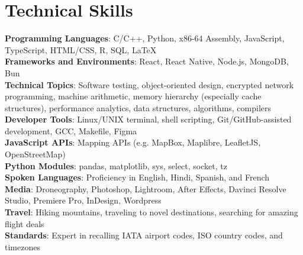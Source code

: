 \documentclass[letterpaper,11pt]{article}
\begin{document}
\section{Technical Skills}
 \begin{itemize}[leftmargin=0in, label={}]
    \small{\item{
      \textbf{Programming Languages}{: C/C++, Python, x86-64 Assembly, JavaScript, TypeScript, HTML/CSS, R, SQL, \LaTeX} \\
      \textbf{Frameworks and Environments}{: React, React Native, Node.js, MongoDB, Bun} \\
      \textbf{Technical Topics}{: Software testing, object-oriented design,
      encrypted network programming, machine arithmetic, memory hierarchy
      (especially cache structures), performance analytics, data structures,
      algorithms, compilers} \\
      \textbf{Developer Tools}{: Linux/UNIX terminal, shell scripting,
      Git/GitHub-assisted development, GCC, Makefile, Figma} \\
      \textbf{JavaScript APIs}{: Mapping APIs (e.g. MapBox, Maplibre, LeafletJS,
      OpenStreetMap)} \\
      \textbf{Python Modules}{: pandas, matplotlib, sys, select, socket, tz}\\
      \textbf{Spoken Languages}{: Proficiency in English, Hindi, Spanish, and French} \\
      \textbf{Media}{: Droneography, Photoshop, Lightroom, After Effects, Davinci Resolve Studio, Premiere Pro, InDesign, Wordpress} \\
     \textbf{Travel}{: Hiking mountains, traveling to novel destinations, searching for amazing flight deals} \\
     \textbf{Standards}{: Expert in recalling IATA airport codes, ISO country codes, and timezones} \\
     
    }}
 \end{itemize}
\end{document}

